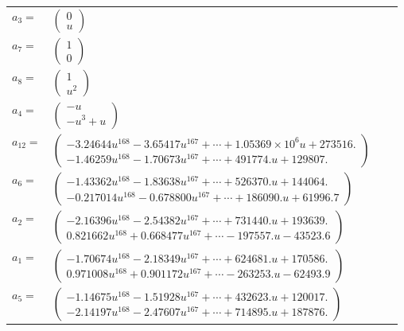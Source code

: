 \documentclass[1p]{elsarticle_modified}
\theoremstyle{definition}
\begin{document}
\begin{tabular}{m{7pt} m{180pt} m{7pt} m{180pt} }
\flushright $a_{3}=$&$\begin{pmatrix}0\\u\end{pmatrix}$ \\
\flushright $a_{7}=$&$\begin{pmatrix}1\\0\end{pmatrix}$ \\
\flushright $a_{8}=$&$\begin{pmatrix}1\\u^2\end{pmatrix}$ \\
\flushright $a_{4}=$&$\begin{pmatrix}- u\\- u^3+u\end{pmatrix}$ \\
\flushright $a_{12}=$&$\begin{pmatrix}-3.24644 u^{168}-3.65417 u^{167}+\cdots+1.05369\times10^{6} u+273516.\\-1.46259 u^{168}-1.70673 u^{167}+\cdots+491774. u+129807.\end{pmatrix}$ \\
\flushright $a_{6}=$&$\begin{pmatrix}-1.43362 u^{168}-1.83638 u^{167}+\cdots+526370. u+144064.\\-0.217014 u^{168}-0.678800 u^{167}+\cdots+186090. u+61996.7\end{pmatrix}$ \\
\flushright $a_{2}=$&$\begin{pmatrix}-2.16396 u^{168}-2.54382 u^{167}+\cdots+731440. u+193639.\\0.821662 u^{168}+0.668477 u^{167}+\cdots-197557. u-43523.6\end{pmatrix}$ \\
\flushright $a_{1}=$&$\begin{pmatrix}-1.70674 u^{168}-2.18349 u^{167}+\cdots+624681. u+170586.\\0.971008 u^{168}+0.901172 u^{167}+\cdots-263253. u-62493.9\end{pmatrix}$ \\
\flushright $a_{5}=$&$\begin{pmatrix}-1.14675 u^{168}-1.51928 u^{167}+\cdots+432623. u+120017.\\-2.14197 u^{168}-2.47607 u^{167}+\cdots+714895. u+187876.\end{pmatrix}$ \\

\end{tabular}
\end{document}
